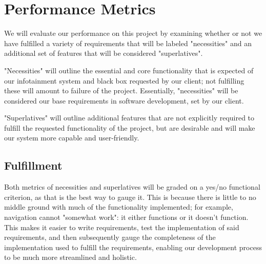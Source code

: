 \documentclass[onecolumn, draftclsnofoot,10pt, compsoc]{IEEEtran}
\begin{document}
\section{Performance Metrics}
We will evaluate our performance on this project by examining whether or not we have fulfilled a variety of requirements that will be labeled "necessities" and an additional set of  features that will be considered "superlatives".\par
"Necessities" will outline the essential and core functionality that is expected of our infotainment system and black box requested by our client; not fulfilling these will amount to failure of the project. Essentially, "necessities" will be considered our base requirements in software development, set by our client.\par
"Superlatives" will outline additional features that are not explicitly required to fulfill the requested functionality of the project, but are desirable and will make our system more capable and user-friendly.\par

\subsection{Fulfillment}
Both metrics of necessities and superlatives will be graded on a yes/no functional criterion, as that is the best way to gauge it. This is because there is little to no middle ground with much of the functionality implemented; for example, navigation cannot "somewhat work": it either functions or it doesn't function. This makes it easier to write requirements, test the implementation of said requirements, and then subsequently gauge the completeness of the  implementation used to fulfill the requirements, enabling our development process to be much more streamlined and holistic.\par
\end{document}
